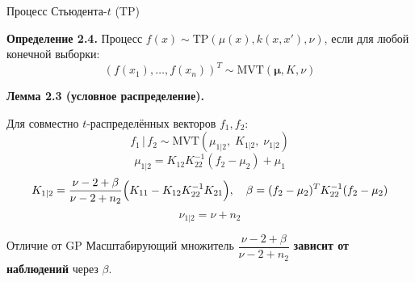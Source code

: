 \documentclass{beamer}
\begin{document}

\begin{frame}{Процесс Стьюдента-$t$ (TP)}

{\small
\textbf{Определение 2.4.} Процесс $f(x) \sim \mathrm{TP}(\mu(x), k(x,x'), \nu)$, если для любой конечной выборки:
\[
    (f(x_1), \ldots, f(x_n))^T \sim \mathrm{MVT}(\boldsymbol{\mu}, K, \nu)
\]

\vspace{3pt}

\textbf{Лемма 2.3 (условное распределение).}

Для совместно $t$-распределённых векторов $f_1, f_2$:
\[
    f_1 \,|\, f_2 \sim \mathrm{MVT}(\mu_{1|2},\; K_{1|2},\; \nu_{1|2})
\]
\[
    \mu_{1|2} = K_{12}K_{22}^{-1}(f_2 - \mu_2) + \mu_1
\]
\[
    K_{1|2} = \frac{\nu - 2 + \beta}{\nu - 2 + n_2}
    \Bigl(K_{11} - K_{12}K_{22}^{-1}K_{21}\Bigr), \quad
    \beta = (f_2-\mu_2)^T K_{22}^{-1}(f_2-\mu_2)
\]
\[
    \nu_{1|2} = \nu + n_2
\]

\begin{block}{Отличие от GP}
Масштабирующий множитель $\dfrac{\nu-2+\beta}{\nu-2+n_2}$ \textbf{зависит от наблюдений} через $\beta$.
\end{block}
}

\end{frame}

\end{document}
